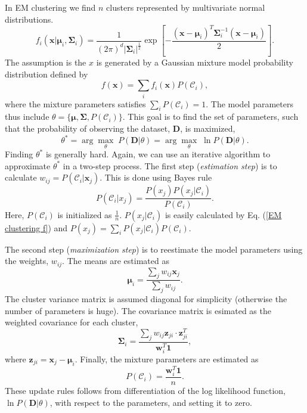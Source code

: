 \documentclass[oneside]{memoir}
\renewcommand{\vec}[1]{\ensuremath{\bm{#1}}}
\begin{document}
In EM clustering we find $n$ clusters represented by multivariate normal distributions.
\begin{equation}
  \label{EM clustering f}
  f_i(\vec{x}|\vec{\mu}_i,\vec{\Sigma}_i) = \frac{1}{(2\pi)^d |\vec{\Sigma}_i|^{\frac{1}{2}}}  \exp \left[ - \frac{(\vec{x}-\vec{\mu}_i)^T\vec{\Sigma}_i^{-1}(\vec{x}-\vec{\mu}_i)}{2} \right]. 
\end{equation}
The assumption is the $x$ is generated by a Gaussian mixture model probability distribution defined by
\begin{equation}
  \label{gaussian mixture model}
f(\vec{x}) = \sum_i f_i(\vec{x}) P(\mathcal{C}_i),
\end{equation}
where the mixture parameters satisfies $\sum_i P(\mathcal{C}_i) = 1$. The model parameters thus include $\theta = \{ \vec{\mu},\vec{\Sigma},P(\mathcal{C}_i)\}$. This goal is to find the set of parameters, such that the probability of observing the dataset, $\vec{D}$, is maximized,
\begin{equation}
  \label{theta max}
  \theta^* = \arg \max_{\theta} \; P(\vec{D}|\theta) =  \arg \max_{\theta} \; \ln P(\vec{D}|\theta).
\end{equation}
Finding $\theta^*$ is generally hard. Again, we can use an iterative algorithm to approximate $\theta^*$ in a two-step process. The first step (\emph{estimation step}) is to calculate $w_{ij} = P(\mathcal{C}_i|\vec{x}_j)$. This is done using Bayes rule
\begin{equation}
  \label{bayes EM}
  P(\mathcal{C}_i|x_j) = \frac{P(x_j) P(x_j|\mathcal{C}_i)}{P(\mathcal{C}_i)}.
\end{equation}
Here, $P(\mathcal{C}_i)$ is initialized as $\frac{1}{n}$. $P(x_j|\mathcal{C}_i)$ is easily calculated by Eq. (\ref{EM clustering f}) and $P(x_j) = \sum_i P(x_j|\mathcal{C}_i) P(\mathcal{C}_i)$. 

The second step (\emph{maximization step}) is to reestimate the model parameters using the weights, $w_{ij}$. The means are estimated as
\begin{equation}
  \label{EM means}
  \vec{\mu}_i = \frac{\sum_j w_{ij} \vec{x}_j}{\sum_j w_{ij}}.
\end{equation}
The cluster variance matrix is assumed diagonal for simplicity (otherwise the number of parameters is huge). The covariance matrix is esimated as the weighted covariance for each cluster,
\begin{equation}
  \label{covariance estimate}
  \vec{\Sigma}_i = \frac{\sum_j w_{ij} \vec{z}_{ji}\cdot \vec{z}^T_{ji}}{\vec{w}_i^T\bm{1}},
\end{equation}
where $\vec{z}_{ji} = \vec{x}_j - \vec{\mu}_i$. Finally, the mixture parameters are estimated as
\begin{equation}
  \label{mixture parameter estimation}
  P(\mathcal{C}_i) = \frac{\vec{w}_i^T \vec{1}}{n}.
\end{equation}
These update rules follows from differentiation of the log likelihood function, $\ln P(\vec{D}|\theta)$, with respect to the parameters, and setting it to zero. 
\end{document}

